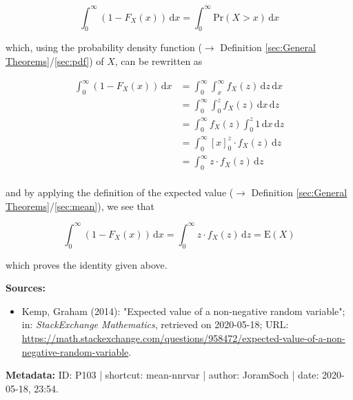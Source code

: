 \documentclass[a4paper,12pt,twoside]{book}
\begin{document}
\begin{equation} \label{eq:mean-nnrvar-mean-cdf-s1}
\int_{0}^{\infty} (1 - F_X(x)) \, \mathrm{d}x = \int_{0}^{\infty} \mathrm{Pr}(X > x) \, \mathrm{d}x
\end{equation}

which, using the probability density function ($\rightarrow$ Definition \ref{sec:General Theorems}/\ref{sec:pdf}) of $X$, can be rewritten as

\begin{equation} \label{eq:mean-nnrvar-mean-cdf-s2}
\begin{split}
\int_{0}^{\infty} (1 - F_X(x)) \, \mathrm{d}x &= \int_{0}^{\infty} \int_{x}^{\infty} f_X(z) \, \mathrm{d}z \, \mathrm{d}x \\
&= \int_{0}^{\infty} \int_{0}^{z} f_X(z) \, \mathrm{d}x \, \mathrm{d}z \\
&= \int_{0}^{\infty} f_X(z) \int_{0}^{z} 1 \, \mathrm{d}x \, \mathrm{d}z \\
&= \int_{0}^{\infty} [x]_{0}^{z} \cdot f_X(z) \, \mathrm{d}z \\
&= \int_{0}^{\infty} z \cdot f_X(z) \, \mathrm{d}z \\
\end{split}
\end{equation}

and by applying the definition of the expected value ($\rightarrow$ Definition \ref{sec:General Theorems}/\ref{sec:mean}), we see that

\begin{equation} \label{eq:mean-nnrvar-mean-cdf-s3}
\int_{0}^{\infty} (1 - F_X(x)) \, \mathrm{d}x = \int_{0}^{\infty} z \cdot f_X(z) \, \mathrm{d}z = \mathrm{E}(X)
\end{equation}

which proves the identity given above.



\vspace{1em}
\textbf{Sources:}
\begin{itemize}
\item Kemp, Graham (2014): "Expected value of a non-negative random variable"; in: \textit{StackExchange Mathematics}, retrieved on 2020-05-18; URL: \url{https://math.stackexchange.com/questions/958472/expected-value-of-a-non-negative-random-variable}.
\end{itemize}


\vspace{1em}
\textbf{Metadata:} ID: P103 | shortcut: mean-nnrvar | author: JoramSoch | date: 2020-05-18, 23:54.
\vspace{1em}
\end{document}
